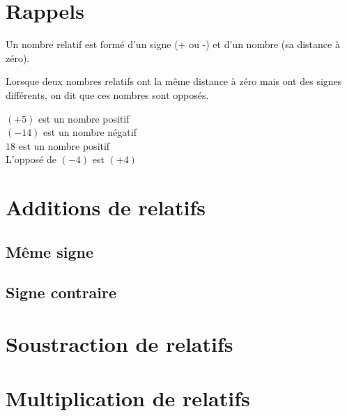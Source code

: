 \documentclass[11pt]{article}
\begin{document}
\section{Rappels}

\begin{propriete}
Un nombre relatif est formé d’un signe (+ ou -) et d’un nombre (sa distance à zéro).
\end{propriete}

\begin{definition}
Lorsque deux nombres relatifs ont la même distance à zéro mais ont des
signes différents, on dit que ces nombres sont opposés.
\end{definition}

\begin{exemple}
$(+5)$ est un nombre positif \\
$(-14)$ est un nombre négatif \\
$18$ est un nombre positif \\
L'opposé de $(-4)$ est $(+4)$
\end{exemple}


\section{Additions de relatifs}

\subsection{Même signe}

\subsection{Signe contraire}

\section{Soustraction de relatifs}

\section{Multiplication de relatifs}
\end{document}
